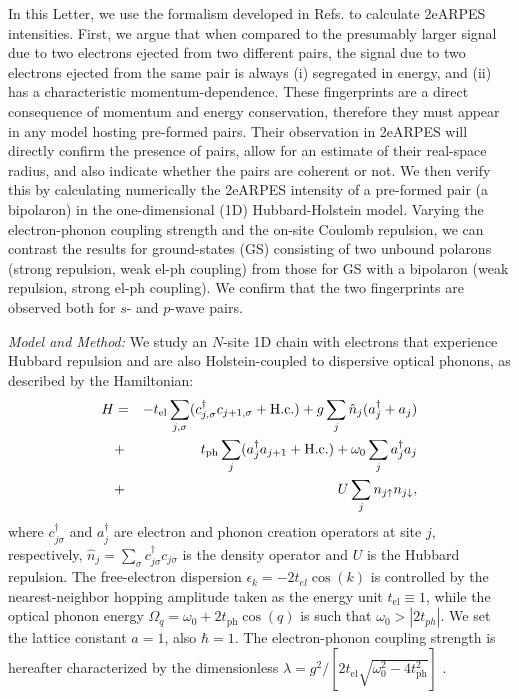 \documentclass[prl,twocolumn,showpacs,amsmath,amssymb,superscriptaddress,floatfix]{revtex4}
\newcommand{\mat}[1]{\mathrm{#1}}
\begin{document}
In this Letter, we  use the formalism developed in Refs. \cite{Eckstein2019,Su2020,Devereaux_2023} to calculate 2eARPES intensities. First, we argue that when compared to the presumably larger signal due to two electrons ejected from two different pairs,  the signal due to two electrons ejected from the same pair is always (i) segregated in energy, and (ii) has a characteristic momentum-dependence. These fingerprints are a direct consequence of momentum and energy conservation, therefore they must appear in any model hosting pre-formed pairs.  Their observation  in 2eARPES will directly confirm the presence of pairs, allow for an estimate of their real-space radius, and also indicate whether the pairs are coherent or not. We then verify this  by calculating numerically the 2eARPES intensity of a pre-formed pair (a bipolaron) in the one-dimensional (1D) Hubbard-Holstein model. Varying the electron-phonon coupling strength and the on-site Coulomb repulsion, we can contrast the results for ground-states (GS) consisting of two unbound polarons (strong repulsion, weak el-ph coupling) from those for GS with a bipolaron (weak repulsion, strong el-ph coupling). We confirm that the two fingerprints are observed both for $s$- and $p$-wave pairs.






{\em Model and Method:} We study  an $N$-site 1D chain  with electrons that experience Hubbard repulsion and are  also Holstein-coupled to dispersive optical phonons, as described by the Hamiltonian:
\begin{eqnarray} \label{hol}
\vspace*{-0.0cm}
H &=& -t_\mathrm{el}\sum_{j,\sigma}(c^\dagger_{j,\sigma} c_{j+1,\sigma} +\mathrm{H.c.}) + {g} \sum_{j} \hat n_{j} (a_{j}^\dagger + a_{j})  \nonumber \\
 &+&  t_\mathrm{ph}\sum_{j}(a^\dagger_{j} a_{j+1} +\mathrm{H.c.})
+ \omega_0\sum_{j} a_{j}^\dagger  a_{j} \nonumber\\
&+& U\sum_j n_{j\uparrow}n_{j\downarrow}, \label{ham}
\end{eqnarray}
where $c^\dagger_{j\sigma}$ and $a^\dagger_{j}$ are electron and phonon creation operators at site $j$, respectively,  $\hat n _{j} = \sum_\sigma c^\dagger_{j\sigma}c_{j\sigma}$  is the density operator and $U$ is the Hubbard repulsion. The free-electron dispersion $\epsilon_k = - 2 t_{el} \cos(k)$ is controlled by the nearest-neighbor hopping amplitude taken as the energy unit $t_\mat{el}\equiv 1$, while the optical phonon energy $\Omega_q=\omega_0 + 2t_\mathrm{ph}\cos(q)$ is such that $\omega_0>  |2t_{ph}|$. We set the lattice constant $a=1$, also $\hbar =1$. The electron-phonon  coupling strength is hereafter characterized by
 the  dimensionless  $\lambda =g^2/[2t_\mat{el}\sqrt{\omega_0^2-4t_\mathrm{ph}^2}]$  \cite{berciu2013}.
\end{document}
